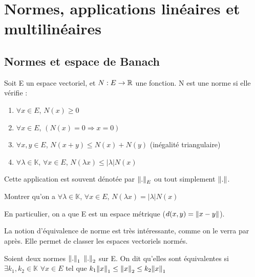 \chapter{Normes, applications linéaires et multilinéaires}
\label{chapter_linear_application}



\section{Normes et espace de Banach}

\begin{definition}
    Soit E un espace vectoriel, et $N : E \rightarrow \mathbb{R}$ une fonction.
    N est une norme si elle vérifie :
    \begin{enumerate}
        \item $\forall x \in E$, $N(x) \geq 0$
        \item $\forall x \in E$, $(N(x) = 0 \Rightarrow x = 0)$
        \item $\forall x, y \in E$, $N(x + y) \leq N(x) + N(y)$ (inégalité
            triangulaire)
        \item $\forall \lambda \in \mathbb{K}$, $\forall x \in E$, $N(\lambda x)
            \leq |\lambda| N(x)$
    \end{enumerate}
    Cette application est souvent dénotée par $\norm{.}_{E}$ ou tout simplement
    $\norm{.}$.
\end{definition}

\begin{exercice}
    Montrer qu'on a
    $\forall \lambda \in \mathbb{K}$, $\forall x \in E$, $N(\lambda x) =
    |\lambda| N(x)$
\end{exercice}

En particulier, on a que E est un espace métrique ($d(x, y) = \norm{x - y}$).

La notion d'équivalence de norme est très intéressante, comme on le verra par
après. Elle permet de classer les espaces vectoriels normés.

\begin{definition}
    Soient deux normes $\norm{.}_{1}$ $\norm{.}_{2}$ sur E. On dit
	qu'elles sont équivalentes si $\exists k_{1}, k_{2} \in \mathbb{K}$ $\forall
	x \in E$ tel que $k_{1} \norm{x}_{1} \leq \norm{x}_{2} \leq
	k_{2} \norm{x}_{1}$
\end{definition}

